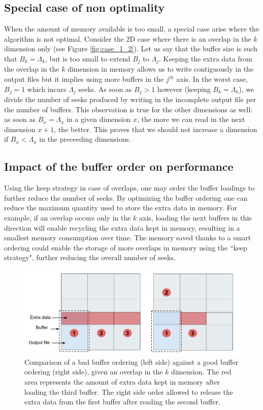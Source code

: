 \documentclass[conference]{IEEEtran}
\begin{document}
\subsection{Special case of non optimality}
When the amount of memory available is too small, a special case arise where the algorithm is not optimal.
Consider the 2D case where there is an overlap in the $k$ dimension only (see Figure \ref{fig:case_1_2}).
Let us say that the buffer size is such that $B_k = \Lambda_k$, but is too small to extend $B_j$ to $\Lambda_j$.
Keeping the extra data from the overlap in the $k$ dimension in memory allows us to write contiguously in the output files but it implies using more buffers in the $j^{th}$ axis.
In the worst case, $B_j = 1$ which incurs $\Lambda_j$ seeks.
As soon as $B_j > 1$ however (keeping $B_k = \Lambda_k$), we divide the number of seeks produced by writing in the incomplete output file per the number of buffers.
This observation is true for the other dimensions as well: as soon as $B_x = \Lambda_x$ in a given dimension $x$, the more we can read in the next dimension $x+1$, the better.
This proves that we should not increase a dimension if $B_x < \Lambda_x$ in the preceeding dimensions.

\subsection{Impact of the buffer order on performance}
Using the keep strategy in case of overlaps, one may order the buffer loadings to further reduce the number of seeks.
By optimizing the buffer ordering one can reduce the maximum quantity used to store the extra data in memory.
For example, if an overlap occurs only in the $k$ axis, loading the next buffers in this direction will enable recycling the extra data kept in memory, resulting in a smallest memory consumption over time.
The memory saved thanks to a smart ordering could enable the storage of more overlaps in memory using the ``keep strategy", further reducing the overall number of seeks. \\

\begin{figure}[h]
\includegraphics[scale=0.2]{./figures/goodorderingbadordering.png}
\caption{ Comparison of a bad buffer ordering (left side) against a good buffer ordering (right side), given an overlap in the $k$ dimension.
The red area represents the amount of extra data kept in memory after loading the third buffer.
The right side order allowed to release the extra data from the first buffer after reading the second buffer.
}
\label{fig:goodorderingbadordering}
\end{figure}
\end{document}
